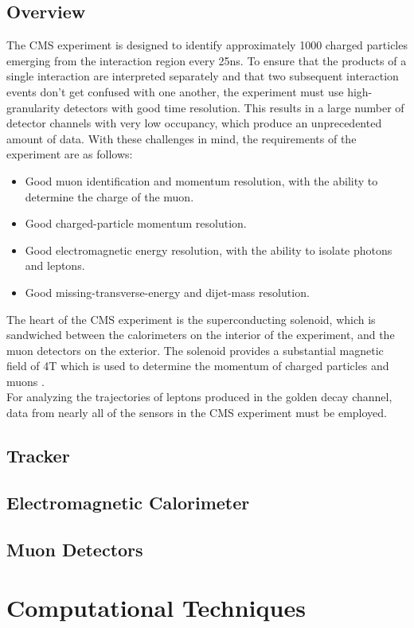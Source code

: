 \documentclass[12pt]{article}
\newcommand{\npar}{\\[0.5cm] \noindent}
\begin{document}
\subsection{Overview}
The CMS experiment is designed to identify approximately 1000 charged particles emerging from the interaction region every 25ns. To ensure that the products of a single interaction are interpreted separately and that two subsequent interaction events don't get confused with one another, the experiment must use high-granularity detectors with good time resolution. This results in a large number of detector channels with very low occupancy, which produce an unprecedented amount of data. With these challenges in mind, the requirements of the experiment are as follows:
\begin{itemize}
\item Good muon identification and momentum resolution, with the ability to determine the charge of the muon.
\item Good charged-particle momentum resolution.
\item Good electromagnetic energy resolution, with the ability to isolate photons and leptons.
\item Good missing-transverse-energy and dijet-mass resolution.
\end{itemize}
\noindent
The heart of the CMS experiment is the superconducting solenoid, which is sandwiched between the calorimeters on the interior of the experiment, and the muon detectors on the exterior\cite{cms_design}. The solenoid provides a substantial magnetic field of 4T which is used to determine the momentum of charged particles and muons \cite{physics_requirements}. 
\npar
For analyzing the trajectories of leptons produced in the golden decay channel, data from nearly all of the sensors in the CMS experiment must be employed\cite{cms_tdr}.
\subsection{Tracker}
\subsection{Electromagnetic Calorimeter}
\subsection{Muon Detectors}


\section{Computational Techniques}
\label{comp_tech}
\end{document}
